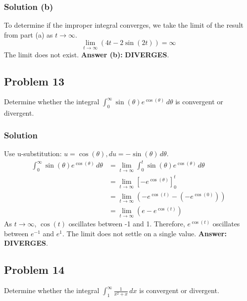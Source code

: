 \documentclass{article}
\begin{document}
\subsubsection*{Solution (b)}
To determine if the improper integral converges, we take the limit of the result from part (a) as $ t \to \infty $.
\[ \lim_{t \to \infty} (4t - 2\sin(2t)) = \infty \]
The limit does not exist.
\textbf{Answer (b):} \textbf{DIVERGES}.

\subsection{Problem 13}
Determine whether the integral $ \int_{0}^{\infty} \sin(\theta)e^{\cos(\theta)} \,d\theta $ is convergent or divergent.
\subsubsection*{Solution}
Use u-substitution: $ u = \cos(\theta), du = -\sin(\theta) \,d\theta $.
\begin{align*}
    \int_{0}^{\infty} \sin(\theta)e^{\cos(\theta)} \,d\theta &= \lim_{t \to \infty} \int_{0}^{t} \sin(\theta)e^{\cos(\theta)} \,d\theta \\
    &= \lim_{t \to \infty} \left[ -e^{\cos(\theta)} \right]_{0}^{t} \\
    &= \lim_{t \to \infty} \left( -e^{\cos(t)} - (-e^{\cos(0)}) \right) \\
    &= \lim_{t \to \infty} \left( e - e^{\cos(t)} \right)
\end{align*}
As $ t \to \infty $, $ \cos(t) $ oscillates between -1 and 1. Therefore, $ e^{\cos(t)} $ oscillates between $ e^{-1} $ and $ e^1 $. The limit does not settle on a single value.
\textbf{Answer:} \textbf{DIVERGES}.

\subsection{Problem 14}
Determine whether the integral $ \int_{1}^{\infty} \frac{1}{x^2+x} \,dx $ is convergent or divergent.
\end{document}

